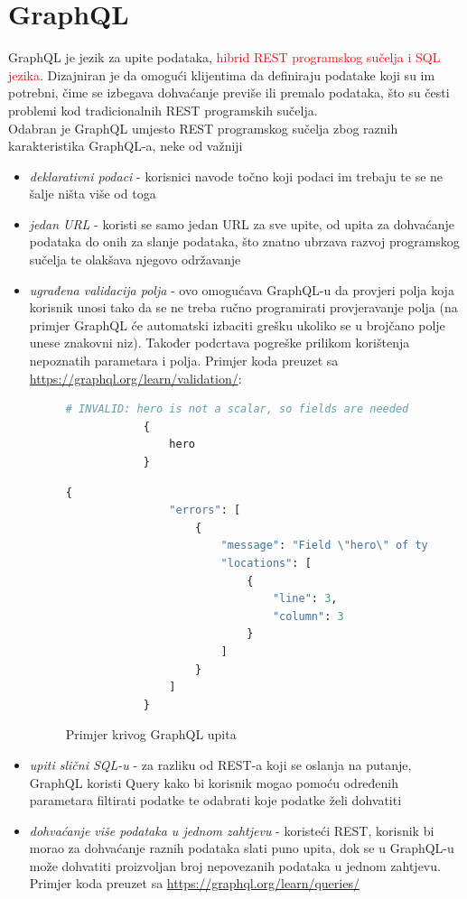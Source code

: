 \documentclass[zavrsnirad]{fer}
\begin{document}
\section{GraphQL}
GraphQL je jezik za upite podataka, \textcolor{red}{hibrid REST programskog sučelja i SQL jezika}. Dizajniran je da omogući klijentima da definiraju podatake koji su im potrebni, čime se izbegava dohvaćanje previše ili premalo podataka, što su česti problemi kod tradicionalnih REST programskih sučelja.
\\Odabran je GraphQL umjesto REST programskog sučelja zbog raznih karakteristika GraphQL-a, neke od važniji
 \begin{itemize}
 	\item \textit{deklarativni podaci} - korisnici navode točno koji podaci im trebaju te se ne šalje ništa više od toga
 	\item \textit{jedan URL} - koristi se samo jedan URL za sve upite, od upita za dohvaćanje podataka do onih za slanje podataka, što znatno ubrzava razvoj programskog sučelja te olakšava njegovo održavanje
 	\item \textit{ugrađena validacija polja} - ovo omogućava GraphQL-u da provjeri polja koja korisnik unosi tako da se ne treba ručno programirati provjeravanje polja (na primjer GraphQL će automatski izbaciti grešku ukoliko se u brojčano polje unese znakovni niz). Također podcrtava pogreške prilikom korištenja nepoznatih parametara i polja. Primjer koda preuzet sa  \url{https://graphql.org/learn/validation/}:

	\begin{figure}[htb]
		\centering
		 	\begin{lstlisting}[language=GraphQL]
			# INVALID: hero is not a scalar, so fields are needed
			{
				hero
			}
		\end{lstlisting}
		\begin{lstlisting}[language=GraphQL]
			{
				"errors": [
					{
						"message": "Field \"hero\" of type \"Character\" must have a selection of subfields. Did you mean \"hero { ... }\"?",
						"locations": [
							{
								"line": 3,
								"column": 3
							}
						]
					}
				]
			}
		\end{lstlisting}
		\caption{Primjer krivog GraphQL upita}
	\end{figure}
	\FloatBarrier

 	\item \textit{upiti slični SQL-u} - za razliku od REST-a koji se oslanja na putanje, GraphQL koristi Query kako bi korisnik mogao pomoću određenih parametara filtirati podatke te odabrati koje podatke želi dohvatiti
 	\item \textit{dohvaćanje više podataka u jednom zahtjevu} - koristeći REST, korisnik bi morao za dohvaćanje raznih podataka slati puno upita, dok se u GraphQL-u može dohvatiti proizvoljan broj nepovezanih podataka u jednom zahtjevu. Primjer koda preuzet sa \url{https://graphql.org/learn/queries/}


\end{itemize}
\end{document}
